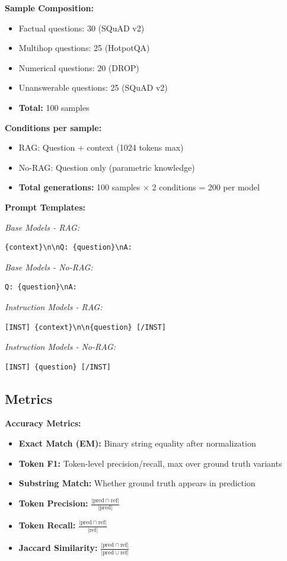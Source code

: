 \documentclass[11pt,a4paper]{article}
\begin{document}
\textbf{Sample Composition:}
\begin{itemize}
\item Factual questions: 30 (SQuAD v2)
\item Multihop questions: 25 (HotpotQA)
\item Numerical questions: 20 (DROP)
\item Unanswerable questions: 25 (SQuAD v2)
\item \textbf{Total:} 100 samples
\end{itemize}

\textbf{Conditions per sample:}
\begin{itemize}
\item RAG: Question + context (1024 tokens max)
\item No-RAG: Question only (parametric knowledge)
\item \textbf{Total generations:} 100 samples $\times$ 2 conditions = 200 per model
\end{itemize}

\textbf{Prompt Templates:}

\textit{Base Models - RAG:}
\begin{lstlisting}
{context}\n\nQ: {question}\nA:
\end{lstlisting}

\textit{Base Models - No-RAG:}
\begin{lstlisting}
Q: {question}\nA:
\end{lstlisting}

\textit{Instruction Models - RAG:}
\begin{lstlisting}
[INST] {context}\n\n{question} [/INST]
\end{lstlisting}

\textit{Instruction Models - No-RAG:}
\begin{lstlisting}
[INST] {question} [/INST]
\end{lstlisting}

\subsection{Metrics}

\textbf{Accuracy Metrics:}
\begin{itemize}
\item \textbf{Exact Match (EM):} Binary string equality after normalization
\item \textbf{Token F1:} Token-level precision/recall, max over ground truth variants
\item \textbf{Substring Match:} Whether ground truth appears in prediction
\item \textbf{Token Precision:} $\frac{|\text{pred} \cap \text{ref}|}{|\text{pred}|}$
\item \textbf{Token Recall:} $\frac{|\text{pred} \cap \text{ref}|}{|\text{ref}|}$
\item \textbf{Jaccard Similarity:} $\frac{|\text{pred} \cap \text{ref}|}{|\text{pred} \cup \text{ref}|}$
\end{itemize}
\end{document}
